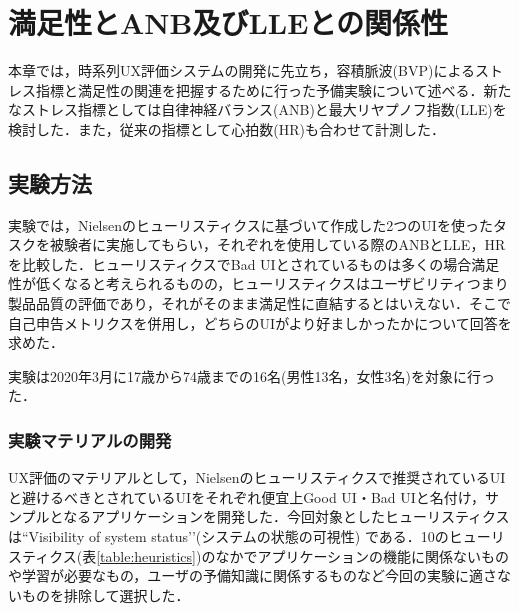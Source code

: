 \chapter{満足性とANB及びLLEとの関係性}
\label{chap:pulsewave}

本章では，時系列UX評価システムの開発に先立ち，容積脈波(BVP)によるストレス指標と満足性の関連を把握するために行った予備実験について述べる．新たなストレス指標としては自律神経バランス(ANB)と最大リヤプノフ指数(LLE)を検討した．また，従来の指標として心拍数(HR)も合わせて計測した．

\section{実験方法}

実験では，Nielsenのヒューリスティクスに基づいて作成した2つのUIを使ったタスクを被験者に実施してもらい，それぞれを使用している際のANBとLLE，HRを比較した．ヒューリスティクスでBad UIとされているものは多くの場合満足性が低くなると考えられるものの，ヒューリスティクスはユーザビリティつまり製品品質の評価であり，それがそのまま満足性に直結するとはいえない．そこで自己申告メトリクスを併用し，どちらのUIがより好ましかったかについて回答を求めた．

実験は2020年3月に17歳から74歳までの16名(男性13名，女性3名)を対象に行った．

\subsection{実験マテリアルの開発}

UX評価のマテリアルとして，Nielsenのヒューリスティクスで推奨されているUIと避けるべきとされているUIをそれぞれ便宜上Good UI・Bad UIと名付け，サンプルとなるアプリケーションを開発した．今回対象としたヒューリスティクスは``Visibility of system status'’(システムの状態の可視性)\cite{nielsen1990} である．10のヒューリスティクス(表\ref{table:heuristics})のなかでアプリケーションの機能に関係ないものや学習が必要なもの，ユーザの予備知識に関係するものなど今回の実験に適さないものを排除して選択した．

